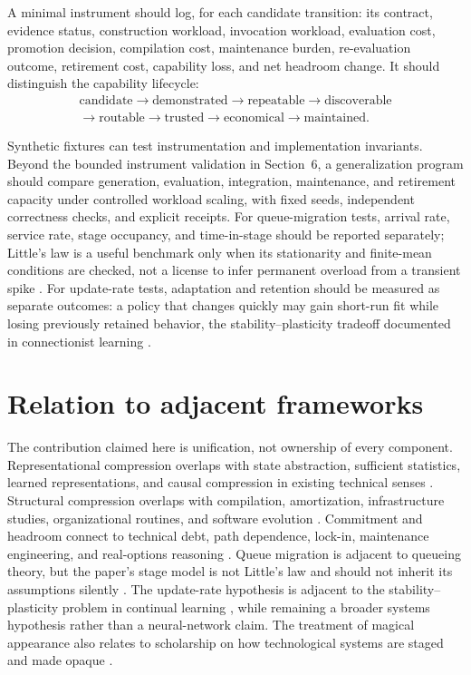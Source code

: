\documentclass[11pt]{article}
\begin{document}
A minimal instrument should log, for each candidate transition: its contract, evidence status, construction workload, invocation workload, evaluation cost, promotion decision, compilation cost, maintenance burden, re-evaluation outcome, retirement cost, capability loss, and net headroom change. It should distinguish the capability lifecycle:
\[
\begin{gathered}
\text{candidate}\rightarrow\text{demonstrated}\rightarrow\text{repeatable}\rightarrow\text{discoverable}\\
\rightarrow\text{routable}\rightarrow\text{trusted}\rightarrow\text{economical}\rightarrow\text{maintained}.
\end{gathered}
\]

Synthetic fixtures can test instrumentation and implementation invariants. Beyond the bounded instrument validation in Section~6, a generalization program should compare generation, evaluation, integration, maintenance, and retirement capacity under controlled workload scaling, with fixed seeds, independent correctness checks, and explicit receipts. For queue-migration tests, arrival rate, service rate, stage occupancy, and time-in-stage should be reported separately; Little's law is a useful benchmark only when its stationarity and finite-mean conditions are checked, not a license to infer permanent overload from a transient spike \citep{little1961}. For update-rate tests, adaptation and retention should be measured as separate outcomes: a policy that changes quickly may gain short-run fit while losing previously retained behavior, the stability--plasticity tradeoff documented in connectionist learning \citep{french1999}.

\section{Relation to adjacent frameworks}

The contribution claimed here is unification, not ownership of every component. Representational compression overlaps with state abstraction, sufficient statistics, learned representations, and causal compression in existing technical senses \citep{causalcompression2016,wendong2025,li2006}. Structural compression overlaps with compilation, amortization, infrastructure studies, organizational routines, and software evolution \citep{lehman1980,tarjan1985,star1996}. Commitment and headroom connect to technical debt, path dependence, lock-in, maintenance engineering, and real-options reasoning \citep{cunningham1992,arthur1989,dixit1994}. Queue migration is adjacent to queueing theory, but the paper's stage model is not Little's law and should not inherit its assumptions silently \citep{little1961}. The update-rate hypothesis is adjacent to the stability--plasticity problem in continual learning \citep{french1999}, while remaining a broader systems hypothesis rather than a neural-network claim. The treatment of magical appearance also relates to scholarship on how technological systems are staged and made opaque \citep{conjuringalgorithms2024}.
\end{document}
